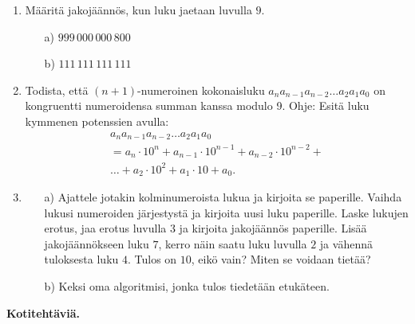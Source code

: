 \begin{enumerate}
\item
Määritä jakojäännös, kun luku jaetaan luvulla $9$.
\begin{itemize}
\item[a)] $999\, 000\, 000\, 800$
\item[b)] $111\, 111\, 111\, 111$
\end{itemize}

\item
Todista, että $(n+1)$-numeroinen kokonaisluku $a_na_{n-1}a_{n-2}\ldots a_2a_1a_0$ on kongruentti numeroidensa summan kanssa modulo 9. Ohje: Esitä luku kymmenen potenssien avulla:
\begin{multline*}
a_na_{n-1}a_{n-2}\ldots a_2a_1a_0\\ = a_n \cdot 10^n + a_{n-1}\cdot 10^{n-1} + a_{n-2} \cdot 10^{n-2} + \\
\ldots + a_2 \cdot 10^2 + a_1 \cdot 10 + a_0.
\end{multline*}

\item
\begin{itemize}
\item[a)] Ajattele jotakin kolminumeroista lukua ja kirjoita se paperille. Vaihda lukusi numeroiden järjestystä ja kirjoita uusi luku paperille. Laske lukujen erotus, jaa erotus luvulla $3$ ja kirjoita jakojäännös paperille. Lisää jakojäännökseen luku $7$, kerro näin saatu luku luvulla $2$ ja vähennä tuloksesta luku $4$. Tulos on $10$, eikö vain? Miten se voidaan tietää?
\item[b)] Keksi oma algoritmisi, jonka tulos tiedetään etukäteen.
\end{itemize}

\end{enumerate}

{\bf Kotitehtäviä.}


